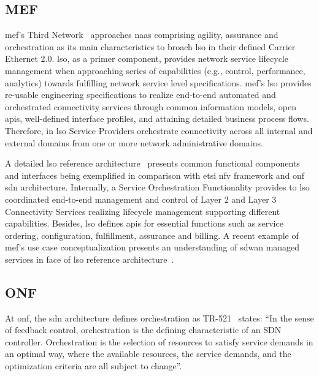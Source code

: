 \subsection{MEF}
\acrfull{mef}'s Third Network~\cite{MEF:Third:2015} approaches \gls{naas} comprising agility, assurance and orchestration as its main characteristics to broach \gls{lso} in their defined Carrier Ethernet 2.0. \gls{lso}, as a primer component, provides network service lifecycle management when approaching series of capabilities (e.g., control, performance, analytics) towards fulfilling network service level specifications. \acrfull{mef}'s \gls{lso} provides re-usable engineering specifications to realize end-to-end automated and orchestrated connectivity services through common information models, open \glspl{api}, well-defined interface profiles, and attaining detailed business process flows. Therefore, in \gls{lso} Service Providers orchestrate connectivity across all internal and external domains from one or more network administrative domains. 

A detailed \gls{lso} reference architecture~\cite{MEF:LSO:2016} presents common functional components and interfaces being exemplified in comparison with \gls{etsi} \gls{nfv} framework and \gls{onf} \gls{sdn} architecture. Internally, a Service Orchestration Functionality provides to \gls{lso} coordinated end-to-end management and control of Layer 2 and Layer 3 Connectivity Services realizing lifecycle management supporting different capabilities.
Besides, \gls{lso} defines \glspl{api} for essential functions such as service ordering, configuration, fulfillment, assurance and billing. A recent example of \gls{mef}'s use case conceptualization presents an understanding of \gls{sdwan} managed services in face of \gls{lso} reference architecture~\cite{MEF:SDWAN:2017}.

\subsection{ONF}
At \gls{onf}, the \gls{sdn} architecture defines orchestration as TR-521~\cite{ONF:Orch:2017} states: ``In the sense of feedback control, orchestration is the defining characteristic of an SDN controller. Orchestration is the selection of resources to satisfy service demands in an optimal way, where the available resources, the service demands, and the optimization criteria are all subject to change''.  


